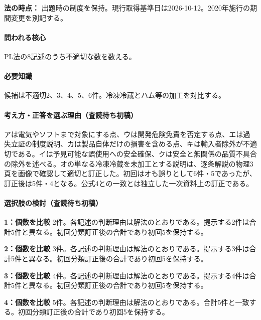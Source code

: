 \noindent\textbf{法の時点：} 出題時の制度を保持。現行取得基準日は2026-10-12。2020年施行の期間変更を別記する。\par

\paragraph{問われる核心} PL法の8記述のうち不適切な数を数える。

\paragraph{必要知識} 候補は不適切2、3、4、5、6件。冷凍冷蔵とハム等の加工を対比する。

\paragraph{考え方・正答を選ぶ理由（査読待ち初稿）} アは電気やソフトまで対象にする点、ウは開発危険免責を否定する点、エは過失立証の制度説明、カは製品自体だけの損害を含める点、キは輸入者除外が不適切である。イは予見可能な誤使用への安全確保、クは安全と無関係の品質不具合の除外を述べる。オの単なる冷凍冷蔵を未加工とする説明は、逐条解説の物理3頁を画像で確認して適切と訂正した。初回はオも誤りとして6件・5であったが、訂正後は5件・4となる。公式4との一致とは独立した一次資料上の訂正である。

\paragraph{選択肢の検討（査読待ち初稿）}\mbox{}\par

\noindent\textbf{1：個数を比較} 2件。各記述の判断理由は解法のとおりである。提示する2件は合計5件と異なる。初回分類訂正後の合計であり初回5を保持する。\par

\noindent\textbf{2：個数を比較} 3件。各記述の判断理由は解法のとおりである。提示する3件は合計5件と異なる。初回分類訂正後の合計であり初回5を保持する。\par

\noindent\textbf{3：個数を比較} 4件。各記述の判断理由は解法のとおりである。提示する4件は合計5件と異なる。初回分類訂正後の合計であり初回5を保持する。\par

\noindent\textbf{4：個数を比較} 5件。各記述の判断理由は解法のとおりである。合計5件と一致する。初回分類訂正後の合計であり初回5を保持する。\par

